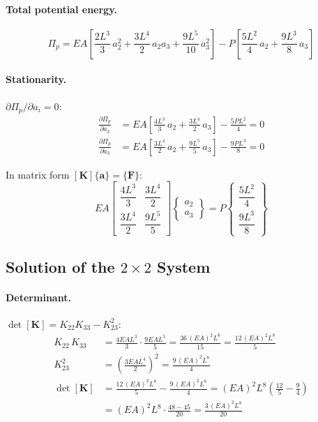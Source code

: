 \documentclass[11pt, a4paper]{article}
\begin{document}
\paragraph{Total potential energy.}
\begin{equation}\label{eq:pi_b}
\Pi_p = EA\left[\frac{2L^3}{3}\,a_2^2+\frac{3L^4}{2}\,a_2 a_3+\frac{9L^5}{10}\,a_3^2\right]
       -P\left[\frac{5L^2}{4}\,a_2+\frac{9L^3}{8}\,a_3\right]
\end{equation}

\paragraph{Stationarity.}
$\partial\Pi_p/\partial a_i=0$:
\begin{align}
\frac{\partial\Pi_p}{\partial a_2}
&= EA\left[\frac{4L^3}{3}\,a_2+\frac{3L^4}{2}\,a_3\right]-\frac{5PL^2}{4}=0
\label{eq:stat1}\\[8pt]
\frac{\partial\Pi_p}{\partial a_3}
&= EA\left[\frac{3L^4}{2}\,a_2+\frac{9L^5}{5}\,a_3\right]-\frac{9PL^3}{8}=0
\label{eq:stat2}
\end{align}

In matrix form $[\mathbf{K}]\{\mathbf{a}\}=\{\mathbf{F}\}$:
\begin{equation}\label{eq:system_b}
EA\begin{bmatrix} \dfrac{4L^3}{3} & \dfrac{3L^4}{2} \\[12pt] \dfrac{3L^4}{2} & \dfrac{9L^5}{5} \end{bmatrix}\begin{Bmatrix} a_2 \\[10pt] a_3 \end{Bmatrix} = P\begin{Bmatrix} \dfrac{5L^2}{4} \\[10pt] \dfrac{9L^3}{8} \end{Bmatrix}
\end{equation}

\subsection{Solution of the \texorpdfstring{$2\times 2$}{2x2} System}

\paragraph{Determinant.}
$\det[\mathbf{K}]=K_{22}K_{33}-K_{23}^2$:
\begin{align*}
K_{22}\,K_{33} &= \frac{4EAL^3}{3}\cdot\frac{9EAL^5}{5}
                = \frac{36\,(EA)^2 L^8}{15}
                = \frac{12\,(EA)^2 L^8}{5} \\[6pt]
K_{23}^2 &= \left(\frac{3EAL^4}{2}\right)^{\!2}
           = \frac{9\,(EA)^2 L^8}{4} \\[6pt]
\det[\mathbf{K}] &= \frac{12\,(EA)^2 L^8}{5}-\frac{9\,(EA)^2 L^8}{4}
                   = (EA)^2 L^8\!\left(\frac{12}{5}-\frac{9}{4}\right) \\[4pt]
                  &= (EA)^2 L^8\cdot\frac{48-45}{20}
                   = \frac{3\,(EA)^2 L^8}{20}
\end{align*}
\end{document}
